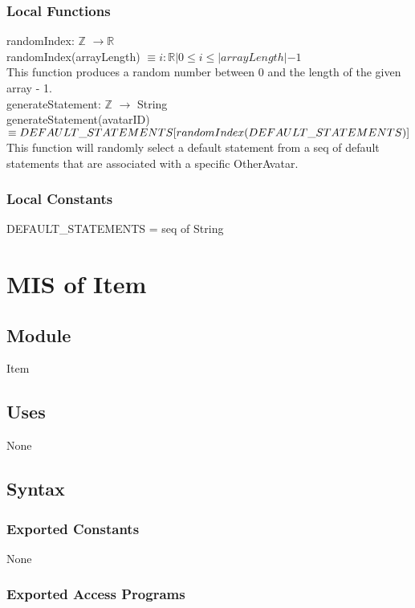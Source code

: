 \documentclass[12pt, titlepage]{article}
\begin{document}
\subsubsection{Local Functions}
randomIndex: $\mathbb{Z}$ $\rightarrow \mathbb{R}$  \\
randomIndex(arrayLength) $\equiv i : \mathbb{R} | 0 \le i \le |arrayLength| - 1 $ \\
This function produces a random number between 0 and the length of the given array - 1. \\

\noindent generateStatement: $\mathbb{Z}$  $\rightarrow$ String\\
generateStatement(avatarID) $\equiv \newline DEFAULT\_STATEMENTS[randomIndex(DEFAULT\_STATEMENTS)]$   \\
This function will randomly select a default statement from a seq of default statements that are associated with a specific OtherAvatar.

\subsubsection{Local Constants}
DEFAULT\_STATEMENTS = seq of String\\

\newpage

\section{MIS of Item} 


\subsection{Module}
Item

\subsection{Uses}
None


\subsection{Syntax}

\subsubsection{Exported Constants}
None

\subsubsection{Exported Access Programs}
\end{document}
